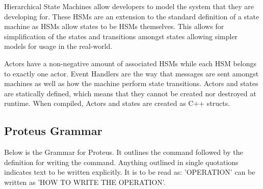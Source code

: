 Hierarchical State Machines allow developers to model the system that they are developing for.
These HSMs are an extension to the standard definition of a state machine as HSMs allow states to be HSMs themselves.
This allows for simplification of the states and transitions amongst states allowing simpler models for usage in the real-world.

Actors have a non-negative amount of associated HSMs while each HSM belongs to exactly one actor.
Event Handlers are the way that messages are sent amongst machines as well as how the machine perform state transitions.
Actors and states are statically defined, which means that they cannot be created nor destroyed at runtime.
When compiled, Actors and states are created as C++ structs.

\subsection{Proteus Grammar}\label{subsec:ProteusGrammar}

Below is the Grammar for Proteus.
It outlines the command followed by the definition for writing the command.
Anything outlined in single quotations indicates text to be written explicitly.
It is to be read as: 'OPERATION' can be written as 'HOW TO WRITE THE OPERATION'.

